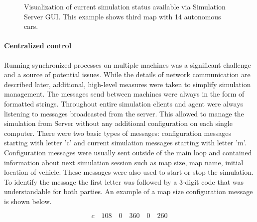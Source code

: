 \documentclass[11pt,english]{article}
\begin{document}
\begin{figure}[!] %
\caption{Visualization of current simulation status available via Simulation Server GUI. This example shows third map with 14 autonomous cars.}
\label{fig:master_gui_small}
\end{figure} 



\paragraph{Centralized control}


Running synchronized processes on multiple machines was a significant challenge and a source of potential issues. While the details of network communication are described later, additional, high-level measures were taken to simplify simulation management. The messages send between machines were always in the form of formatted strings. Throughout entire simulation clients and agent were always listening to messages broadcasted from the server. This allowed to manage the simulation from Server without any additional configuration on each single computer. There were two basic types of messages: configuration messages starting with letter 'c' and current simulation messages starting with letter 'm'.
Configuration messages were usually sent outside of the main loop and contained information about next simulation session such as map size, map name, initial location of vehicle. These messages were also used to start or stop the simulation. To identify the message the first letter was followed by a 3-digit code that was understandable for both parties. An example of a map size configuration message is shown below.

\begin{equation}
c \quad 108 \quad 0 \quad 360 \quad 0 \quad 260
\end{equation}
\end{document}
